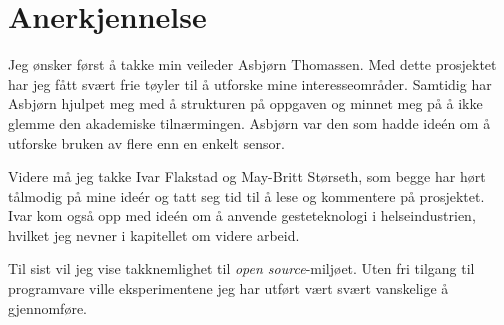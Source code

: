 \section*{Anerkjennelse}
Jeg ønsker først å takke min veileder Asbjørn Thomassen. Med dette prosjektet har jeg fått svært frie tøyler til å utforske mine interesseområder. Samtidig har Asbjørn hjulpet meg med å strukturen på oppgaven og minnet meg på å ikke glemme den akademiske tilnærmingen. Asbjørn var den som hadde ideén om å utforske bruken av flere enn en enkelt sensor.

Videre må jeg takke Ivar Flakstad og May-Britt Størseth, som begge har hørt tålmodig på mine ideér og tatt seg tid til å lese og kommentere på prosjektet. Ivar kom også opp med ideén om å anvende gesteteknologi i helseindustrien, hvilket jeg nevner i kapitellet om videre arbeid.

Til sist vil jeg vise takknemlighet til \emph{open source}-miljøet. Uten fri tilgang til programvare ville eksperimentene jeg har utført vært svært vanskelige å gjennomføre.